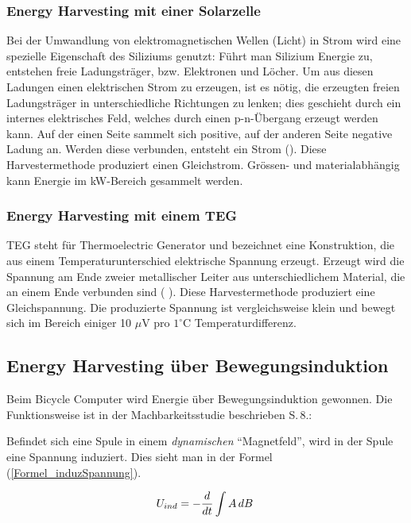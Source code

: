 \subsubsection{Energy Harvesting mit einer Solarzelle}\label{harv_solarzelle} 

Bei der Umwandlung von elektromagnetischen Wellen (Licht) in Strom wird eine spezielle Eigenschaft des Siliziums genutzt: Führt man Silizium Energie zu, entstehen freie Ladungsträger, bzw. Elektronen und Löcher. Um aus diesen Ladungen einen elektrischen Strom zu erzeugen, ist es nötig, die erzeugten freien Ladungsträger in unterschiedliche Richtungen zu lenken; dies geschieht durch ein internes elektrisches Feld, welches durch einen p-n-Übergang erzeugt werden kann. Auf der einen Seite sammelt sich positive, auf der anderen Seite negative Ladung an. Werden diese verbunden, entsteht ein Strom (\cite{Internet_Solarzelle2}). 
Diese Harvestermethode produziert einen Gleichstrom. Grössen- und materialabhängig kann Energie im kW-Bereich gesammelt werden.


\subsubsection{Energy Harvesting mit einem TEG}\label{harv_TEG} 
TEG steht für Thermoelectric Generator und bezeichnet eine Konstruktion, die aus einem Temperaturunterschied elektrische Spannung erzeugt. Erzeugt wird die Spannung am Ende zweier metallischer Leiter aus unterschiedlichem Material, die an einem Ende verbunden sind ( \cite{Journal_TEG}). Diese Harvestermethode produziert eine Gleichspannung. Die produzierte Spannung ist vergleichsweise klein und bewegt sich im Bereich einiger 10 $\mu$V pro $1^\circ$C Temperaturdifferenz.


\subsection{Energy Harvesting über Bewegungsinduktion}\label{harv_bewegung} 
Beim Bicycle Computer wird Energie über Bewegungsinduktion gewonnen. Die Funktionsweise ist in der Machbarkeitsstudie beschrieben \cite{PA_bicycle} S.\,8.:

Befindet sich eine Spule in einem \textit{dynamischen} ``Magnetfeld'', wird in der Spule eine Spannung induziert. Dies sieht man in der Formel (\ref{Formel_induzSpannung}).

\begin{equation}
    U_{ind}=-\frac{d}{dt}\intop A\,dB \ \label{Formel_induzSpannung} 
\end{equation}

